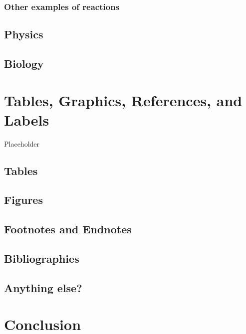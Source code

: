 \documentclass[12pt,twoside]{reedthesis}
\begin{document}
\hypertarget{other-examples-of-reactions}{%
\subsection{Other examples of reactions}\label{other-examples-of-reactions}}

\hypertarget{physics}{%
\section{Physics}\label{physics}}

\hypertarget{biology}{%
\section{Biology}\label{biology}}

\hypertarget{ref-labels}{%
\chapter{Tables, Graphics, References, and Labels}\label{ref-labels}}

Placeholder

\hypertarget{tables}{%
\section{Tables}\label{tables}}

\hypertarget{figures}{%
\section{Figures}\label{figures}}

\hypertarget{footnotes-and-endnotes}{%
\section{Footnotes and Endnotes}\label{footnotes-and-endnotes}}

\hypertarget{bibliographies}{%
\section{Bibliographies}\label{bibliographies}}

\hypertarget{anything-else}{%
\section{Anything else?}\label{anything-else}}

\hypertarget{conclusion}{%
\chapter*{Conclusion}\label{conclusion}}
\end{document}

